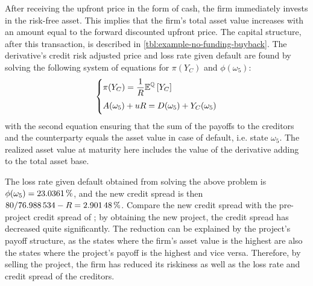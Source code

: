 \documentclass[main.tex]{subfiles}
\begin{document}
            After receiving the upfront price in the form of cash, the firm immediately invests in the risk-free asset. 
            This implies that the firm's total asset value increases 
            with an amount equal to the forward discounted upfront price. 
            The capital structure, after this transaction, is described in \cref{tbl:example-no-funding-buyback}.
            The derivative's credit risk adjusted price and loss rate given default are found
            by solving the following system of equations for $\pi(Y_C)$ and $\phi(\omega_{5})$:
            \begin{align}
                \left\{\begin{array}{@{}l@{}}
                    \displaystyle
                    \pi(Y_C) = \discountfactor\mathbb{E}^{\rnmeasure}\left[Y_{C}\right]
                    \\[1em]
                    \displaystyle
                    A(\omega_5) + uR = D(\omega_5) + Y_C(\omega_5)
                    \\[0.4em]
                \end{array}\right.
                \label{eqn:no-funding-buyback-default-state}
            \end{align}
            with the second equation ensuring that the 
            sum of the payoffs to the creditors and the counterparty
            equals the asset value in case of default, i.e. state $\omega_5$.
            The realized asset value at maturity here includes the value of the derivative adding to the total asset base.

            The loss rate given default obtained from solving the above problem is 
            $\phi(\omega_{5}) = \pct{0.230361}$, 
            and the new credit spread is then 
            $\num{80}/\num{76.988534} - \grossrfrate = \pct{0.0290148}$.
            Compare the new credit spread with the pre-project credit spread of ;
            by obtaining the new project, the credit spread has decreased quite significantly.
            The reduction can be explained by the project's payoff structure,
            as the states where the firm's asset value is the highest are
            also the states where the project's payoff is the highest and vice versa. 
            Therefore, by selling the project, the firm has reduced its riskiness
            as well as the loss rate and credit spread of the creditors.
\end{document}

